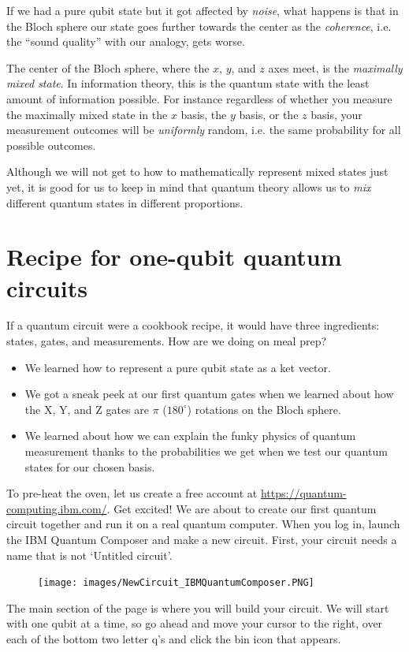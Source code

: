 \documentclass{article}
\theoremstyle{definition}
\begin{document}
If we had a pure qubit state but it got affected by \textit{noise}, what happens is that in the Bloch sphere our state goes further towards the center as the \textit{coherence}, i.e. the ``sound quality'' with our analogy, gets worse.

The center of the Bloch sphere, where the $x$, $y$, and $z$ axes meet, is the \textit{maximally mixed state}.  In information theory, this is the quantum state with the least amount of information possible.  For instance regardless of whether you measure the maximally mixed state in the $x$ basis, the $y$ basis, or the $z$ basis, your measurement outcomes will be \textit{uniformly} random, i.e. the same probability for all possible outcomes.

Although we will not get to how to mathematically represent mixed states just yet, it is good for us to keep in mind that quantum theory allows us to \textit{mix} different quantum states in different proportions.

\newpage
\section{Recipe for one-qubit quantum circuits}
If a quantum circuit were a cookbook recipe, it would have three ingredients: states, gates, and measurements.
How are we doing on meal prep?
\begin{itemize}
	\item We learned how to represent a pure qubit state as a ket vector.
	\item We got a sneak peek at our first quantum gates when we learned about how the X, Y, and Z gates are $\pi$ ($180^{\circ}$) rotations on the Bloch sphere.
	\item We learned about how we can explain the funky physics of quantum measurement thanks to the probabilities we get when we test our quantum states for our chosen basis.
\end{itemize}
To pre-heat the oven, let us create a free account at \url{https://quantum-computing.ibm.com/}.  Get excited!  We are about to create our first quantum circuit together and run it on a real quantum computer.
When you log in, launch the IBM Quantum Composer and make a new circuit.
First, your circuit needs a name that is not `Untitled circuit'.
\begin{figure}[H]
	\texttt{[image: images/NewCircuit\_IBMQuantumComposer.PNG]}
\end{figure}
The main section of the page is where you will build your circuit.  We will start with one qubit at a time, so go ahead and move your cursor to the right, over each of the bottom two letter q's and click the bin icon that appears.
\end{document}
